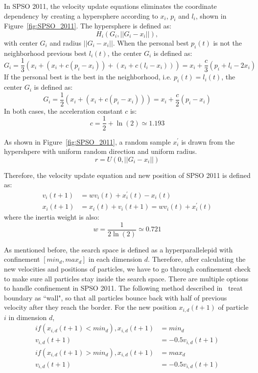 In SPSO 2011, the velocity update equations eliminates the coordinate dependency by creating a hypersphere according to $x_i$, $p_i$ and $l_i$, shown in Figure~\ref{fig:SPSO_2011}.
The hypersphere is defined as:
\begin{displaymath}
H_i(G_i, ||G_i - x_i||),
\end{displaymath}
with center $G_i$ and radius $||G_i - x_i||$.
When the personal best $p_i(t)$ is not the neighborhood previous best $l_i(t)$, the center $G_i$ is defined as:
\begin{displaymath}
G_i = \frac{1}{3} (x_i + (x_i + c(p_i - x_i)) + (x_i + c(l_i - x_i))) = x_i + \frac{c}{3}(p_i + l_i - 2x_i) 
\end{displaymath}
If the personal best is the best in the neighborhood, i.e. $p_i(t) = l_i(t)$, the center $G_i$ is defined as:
\begin{displaymath}
G_i = \frac{1}{2} (x_i + (x_i + c(p_i - x_i))) = x_i + \frac{c}{2}(p_i - x_i)
\end{displaymath}
In both cases, the acceleration constant $c$ is:
\begin{displaymath}
c = \frac{1}{2} + \ln(2) \simeq 1.193
\end{displaymath}

As shown in Figure~\ref{fig:SPSO_2011}, a random sample $x^{'}_{i}$ is drawn from the hypershpere with uniform random direction and uniform radius.
\begin{displaymath}
r = U(0, ||G_i - x_i||)
\end{displaymath} 

Therefore, the velocity update equation and new position of SPSO 2011 is defined as:
\begin{align*}
v_i(t+1) &= wv_i(t) + x_{i}^{'}(t) - x_i(t) \\
x_i(t+1) &= x_i(t) + v_i(t+1) = wv_i(t) + x_{i}^{'}(t) 
\end{align*} 
where the inertia weight is also:
\begin{displaymath}
w = \frac{1}{2\ln(2)} \simeq 0.721
\end{displaymath} 


As mentioned before, the search space is defined as a hyperparallelepid with confinement $[min_d, max_d]$ in each dimension $d$.
Therefore, after calculating the new velocities and positions of particles, we have to go through confinement check to make sure all particles stay inside the search space.
There are multiple options to handle confinement in SPSO 2011.
The following method described in~\cite{Clerc:2012:SPSO2011} treat boundary as ``wall", so that all particles bounce back with half of previous velocity after they reach the border.
For the new position $x_{i,d}(t+1)$ of particle $i$ in dimension $d$,
\begin{align*}
if (x_{i,d}(t+1) < min_d), x_{i,d}(t+1) &= min_d \\
                           v_{i,d}(t+1) &= -0.5v_{i,d}(t+1) \\
if (x_{i,d}(t+1) > min_d), x_{i,d}(t+1) &= max_d \\
                           v_{i,d}(t+1) &= -0.5v_{i,d}(t+1) \end{align*} 


